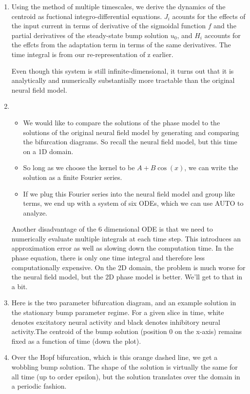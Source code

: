 \documentclass[a4paper,14pt]{article}
\begin{document}
\begin{enumerate}
 \item Using the method of multiple timescales, we derive the dynamics of the centroid as fuctional integro-differential equations. $J_i$ acounts for the effects of the input current in terms of derivative of the sigmoidal function $f$ and the partial derivatives of the steady-state bump solution $u_0$, and $H_i$ accounts for the effcts from the adaptation term in terms of the same derivatives. The time integral is from our re-representation of z earlier.
 
 Even though this system is still infinite-dimensional, it turns out that it is analytically and numerically substantially more tractable than the original neural field model.
 
 \item
 
 \begin{itemize}
  \item We would like to compare the solutions of the phase model to the solutions of the original neural field model by generating and comparing the bifurcation diagrams. So recall the neural field model, but this time on a 1D domain.
  \item  So long as we choose the kernel to be $A+B\cos(x)$, we can write the solution as a finite Fourier series.
  \item  If we plug this Fourier series into the neural field model and group like terms, we end up with a system of six ODEs, which we can use AUTO to analyze.
 \end{itemize}
 
 Another disadvantage of the 6 dimensional ODE is that we need to numerically evaluate multiple integrals at each time step. This introduces an approximation error as well as slowing down the computation time. In the phase equation, there is only one time integral and therefore less computationally expensive. On the 2D domain, the problem is much worse for the neural field model, but the 2D phase model is better. We'll get to that in a bit.

 \item Here is the two parameter bifurcation diagram, and an example solution in the stationary bump parameter regime. For a given slice in time, white denotes excitatory neural activity and black denotes inhibitory neural activity.The centroid of the bump solution (position 0 on the x-axis) remains fixed as a function of time (down the plot). 

 \item Over the Hopf bifurcation, which is this orange dashed line, we get a wobbling bump solution. The shape of the solution is virtually the same for all time (up to order epsilon), but the solution translates over the domain in a periodic fashion.
 

\end{enumerate}
\end{document}
